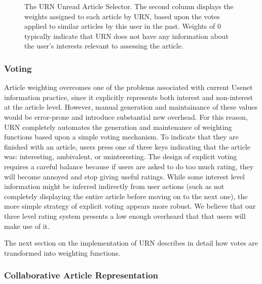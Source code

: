 
\begin{figure*}[t]
  {\centerline{}}
  \caption{The URN Unread Article Selector.  The second column displays the
  weights assigned to each article by URN, based upon the votes applied to
  similar articles by this user in the past.  Weights of 0 typically
  indicate that URN does not have any information about the user's
  interests relevant to assessing the article.}
  \label{fig:sbuff}
\end{figure*}


\subsubsection{Voting}

Article weighting overcomes one of the problems associated with current
Usenet information practice, since it explicitly represents both interest
and non-interest at the article level.  However, manual generation and
maintainance of these values would be error-prone and introduce substantial
new overhead.  For this reason, URN completely automates the generation and
maintenance of weighting functions based upon a simple voting mechanism. To
indicate that they are finished with an article, users press one of three
keys indicating that the article was: interesting, ambivalent, or
uninteresting.  The design of explicit voting requires a careful balance
because if users are asked to do too much rating, they will become annoyed
and stop giving useful ratings.  While some interest level information
might be inferred indirectly from user actions (such as not completely
displaying the entire article before moving on to the next one), the more
simple strategy of explicit voting appears more robust.  We believe that
our three level rating system presents a low enough overheard that that
users will make use of it.

The next section on the implementation of URN describes in detail how 
votes are transformed into weighting functions. 

\subsubsection{Collaborative Article Representation}

